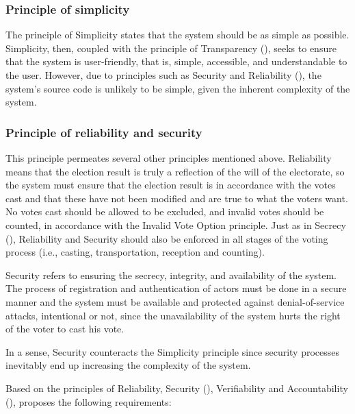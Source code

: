 \documentclass[english]{textolivre}
\begin{document}
\subsubsection{Principle of simplicity \label{sec-Simplicity}}

The principle of Simplicity states that the system should be as simple as possible. Simplicity, then, coupled with the principle of Transparency (), seeks to ensure that the system is user-friendly, that is, simple, accessible, and understandable to the user. However, due to principles such as Security and Reliability (), the system's source code is unlikely to be simple, given the inherent complexity of the system.

\subsubsection{Principle of reliability and security \label{sec-Reliability-sec}}

This principle permeates several other principles mentioned above. Reliability means that the election result is truly a reflection of the will of the electorate, so the system must ensure that the election result is in accordance with the votes cast and that these have not been modified and are true to what the voters want. No votes cast should be allowed to be excluded, and invalid votes should be counted, in accordance with the Invalid Vote Option principle. Just as in Secrecy (), Reliability and Security should also be enforced in all stages of the voting process (i.e., casting, transportation, reception and counting).

Security refers to ensuring the secrecy, integrity, and availability of the system. The process of registration and authentication of actors must be done in a secure manner and the system must be available and protected against denial-of-service attacks, intentional or not, since the unavailability of the system hurts the right of the voter to cast his vote.

In a sense, Security counteracts the Simplicity principle since security processes inevitably end up increasing the complexity of the system.

Based on the principles of Reliability, Security (), Verifiability and Accountability (), \textcite{Gritzalis} proposes the following requirements:
\end{document}
